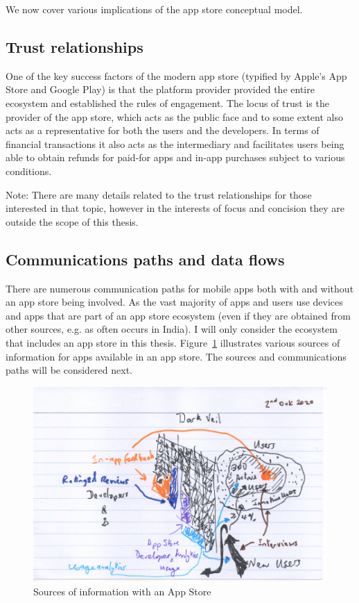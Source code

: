 We now cover various implications of the app store conceptual model.

\subsection{Trust relationships}
One of the key success factors of the modern app store (typified by Apple's App Store and Google Play) is that the platform provider provided the entire ecosystem and established the rules of engagement. The locus of trust is the provider of the app store, which acts as the public face and to some extent also acts as a representative for both the users and the developers. In terms of financial transactions it also acts as the intermediary and facilitates users being able to obtain refunds for paid-for apps and in-app purchases subject to various conditions. 

Note: There are many details related to the trust relationships for those interested in that topic, however in the interests of focus and concision they are outside the scope of this thesis. 

\subsection{Communications paths and data flows}
There are numerous communication paths for mobile apps both with and without an app store being involved. As the vast majority of apps and users use devices and apps that are part of an app store ecosystem (even if they are obtained from other sources, e.g. as often occurs in India). I will only consider the ecosystem that includes an app store in this thesis. Figure~\ref{fig:sources-of-info-with-app-store-background-ch} illustrates various sources of information for apps available in an app store. The sources and communications paths will be considered next. 

\begin{figure}
    \includegraphics[width=\linewidth]{images/rough-sketches/sources-of-information-with-app-store-1.pdf}
    \caption{Sources of information with an App Store}
    \label{fig:sources-of-info-with-app-store-background-ch}
\end{figure}


